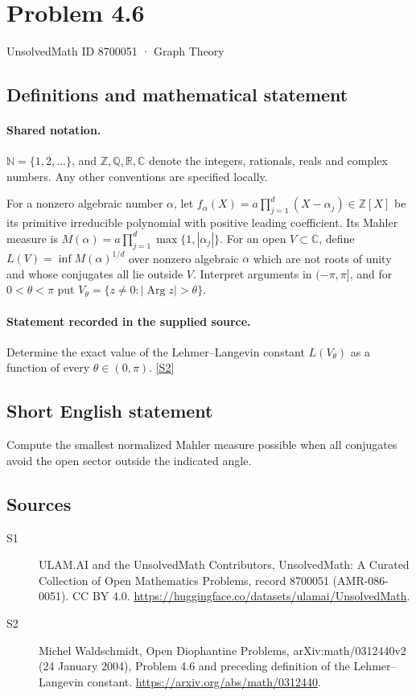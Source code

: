 \documentclass[11pt]{article}
\newcommand{\sref}[2]{\hyperlink{source:#1:#2}{[S#2]}}
\begin{document}
\setcounter{section}{8700050}
\section{Problem 4.6}\label{8700051}
{\small\sffamily UnsolvedMath ID 8700051 · Graph Theory}
\subsection{Definitions and mathematical statement}

\paragraph{Shared notation.}$\mathbb N=\{1,2,\ldots\}$, and $\mathbb Z,\mathbb Q,\mathbb R,\mathbb C$ denote the integers, rationals, reals and complex numbers. Any other conventions are specified locally.


For a nonzero algebraic number $\alpha$, let $f_\alpha(X)=a\prod_{j=1}^d(X-\alpha_j)\in\mathbb Z[X]$ be its primitive irreducible polynomial with positive leading coefficient. Its Mahler measure is $M(\alpha)=a\prod_{j=1}^d\max\{1,|\alpha_j|\}$. For an open $V\subset\mathbb C$, define $L(V)=\inf M(\alpha)^{1/d}$ over nonzero algebraic $\alpha$ which are not roots of unity and whose conjugates all lie outside $V$. Interpret arguments in $(-\pi,\pi]$, and for $0<\theta<\pi$ put $V_\theta=\{z\ne0:|\operatorname{Arg}z|>\theta\}$.
\paragraph{Statement recorded in the supplied source.}
Determine the exact value of the Lehmer--Langevin constant $L(V_\theta)$ as a function of every $\theta\in(0,\pi)$. \sref{8700051}{2}
\subsection{Short English statement}
Compute the smallest normalized Mahler measure possible when all conjugates avoid the open sector outside the indicated angle.
\subsection{Sources}
\begin{description}
\item[\hypertarget{source:8700051:1}{S1}] ULAM.AI and the UnsolvedMath Contributors, UnsolvedMath: A Curated Collection of Open Mathematics Problems, record 8700051 (AMR-086-0051). CC BY 4.0. \url{https://huggingface.co/datasets/ulamai/UnsolvedMath}.
\item[\hypertarget{source:8700051:2}{S2}] Michel Waldschmidt, Open Diophantine Problems, arXiv:math/0312440v2 (24 January 2004), Problem 4.6 and preceding definition of the Lehmer--Langevin constant. \url{https://arxiv.org/abs/math/0312440}.
\end{description}
\label{end:8700051}
\end{document}
